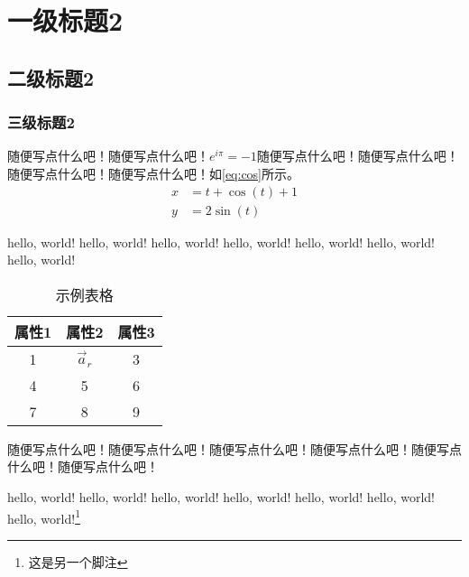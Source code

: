 \chapter{一级标题2}
\section{二级标题2}
\subsection{三级标题2}
随便写点什么吧！随便写点什么吧！$e^{i\pi}=-1$随便写点什么吧！随便写点什么吧！随便写点什么吧！随便写点什么吧！如\ref{eq:cos}所示。
\begin{align}
    x &=t+\cos(t)  + 1 \label{eq:cos}  \\
    y &=2\sin(t)
\end{align}


hello, world! hello, world! hello, world! hello, world! hello, world! hello, world! hello, world!

\begin{table}[h]

\caption{示例表格}
\begin{center}
    \begin{tabular}{ccc} 
    \toprule
    \textbf{属性1} & \textbf{属性2} & \textbf{属性3} \\ \midrule
    1            & $\Vec{a}_r$  & 3            \\
    4            & 5            & 6            \\
    7            & 8            & 9            \\ \bottomrule
    \end{tabular}
\end{center}\label{tab:exp_table}

\end{table}

随便写点什么吧！随便写点什么吧！随便写点什么吧！随便写点什么吧！随便写点什么吧！随便写点什么吧！

hello, world! hello, world! hello, world! hello, world! hello, world! hello, world! hello, world!\footnote{这是另一个脚注}